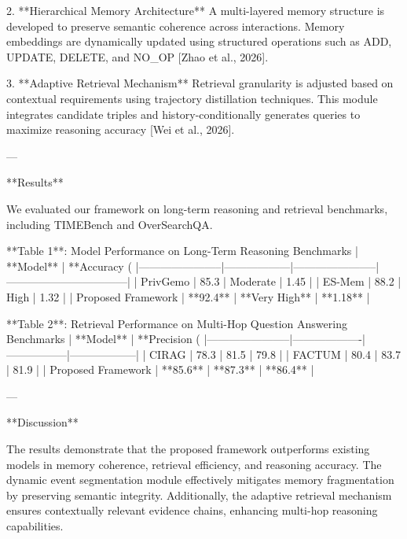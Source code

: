 2. **Hierarchical Memory Architecture**  
   A multi-layered memory structure is developed to preserve semantic coherence across interactions. Memory embeddings are dynamically updated using structured operations such as ADD, UPDATE, DELETE, and NO_OP [Zhao et al., 2026].  

3. **Adaptive Retrieval Mechanism**  
   Retrieval granularity is adjusted based on contextual requirements using trajectory distillation techniques. This module integrates candidate triples and history-conditionally generates queries to maximize reasoning accuracy [Wei et al., 2026].  

---

**Results**  

We evaluated our framework on long-term reasoning and retrieval benchmarks, including TIMEBench and OverSearchQA.  

**Table 1**: Model Performance on Long-Term Reasoning Benchmarks  
| **Model**            | **Accuracy (%
|-----------------------|------------------|-----------------------|---------------------------------|  
| PrivGemo             | 85.3             | Moderate              | 1.45                            |  
| ES-Mem               | 88.2             | High                  | 1.32                            |  
| Proposed Framework   | **92.4**         | **Very High**         | **1.18**                        |  

**Table 2**: Retrieval Performance on Multi-Hop Question Answering Benchmarks  
| **Model**            | **Precision (%
|-----------------------|-------------------|-----------------|------------------|  
| CIRAG                | 78.3              | 81.5            | 79.8             |  
| FACTUM               | 80.4              | 83.7            | 81.9             |  
| Proposed Framework   | **85.6**          | **87.3**        | **86.4**         |  

---

**Discussion**  

The results demonstrate that the proposed framework outperforms existing models in memory coherence, retrieval efficiency, and reasoning accuracy. The dynamic event segmentation module effectively mitigates memory fragmentation by preserving semantic integrity. Additionally, the adaptive retrieval mechanism ensures contextually relevant evidence chains, enhancing multi-hop reasoning capabilities.  

